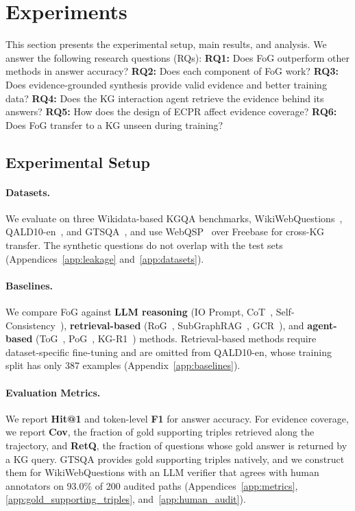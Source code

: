 \section{Experiments}

This section presents the experimental setup, main results, and analysis. We answer the following research questions (RQs):
\textbf{RQ1:} Does FoG outperform other methods in answer accuracy?
\textbf{RQ2:} Does each component of FoG work?
\textbf{RQ3:} Does evidence-grounded synthesis provide valid evidence and better training data?
\textbf{RQ4:} Does the KG interaction agent retrieve the evidence behind its answers?
\textbf{RQ5:} How does the design of ECPR affect evidence coverage?
\textbf{RQ6:} Does FoG transfer to a KG unseen during training?



\subsection{Experimental Setup}

\paragraph{Datasets.}
We evaluate on three Wikidata-based KGQA benchmarks, WikiWebQuestions~\citep{wikiwebQuestions}, QALD10-en~\citep{qald10en}, and GTSQA~\citep{GTSQA}, and use WebQSP~\citep{webqsp} over Freebase for cross-KG transfer. The synthetic questions do not overlap with the test sets (Appendices~\ref{app:leakage} and~\ref{app:datasets}).

\paragraph{Baselines.}
We compare FoG against \textbf{LLM reasoning} (IO Prompt, CoT~\citep{CoT}, Self-Consistency~\citep{Self-Consistency}), \textbf{retrieval-based} (RoG~\citep{RoG}, SubGraphRAG~\citep{SubGraphRAG}, GCR~\citep{GCR}), and \textbf{agent-based} (ToG~\citep{ToG}, PoG~\citep{PoG}, KG-R1~\citep{KG-R1}) methods. Retrieval-based methods require dataset-specific fine-tuning and are omitted from QALD10-en, whose training split has only 387 examples (Appendix~\ref{app:baselines}).

\paragraph{Evaluation Metrics.}
We report \textbf{Hit@1} and token-level \textbf{F1} for answer accuracy. For evidence coverage, we report \textbf{Cov}, the fraction of gold supporting triples retrieved along the trajectory, and \textbf{RetQ}, the fraction of questions whose gold answer is returned by a KG query. GTSQA provides gold supporting triples natively, and we construct them for WikiWebQuestions with an LLM verifier that agrees with human annotators on 93.0\% of 200 audited paths (Appendices~\ref{app:metrics}, \ref{app:gold_supporting_triples}, and~\ref{app:human_audit}).


